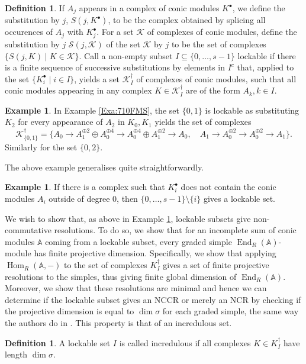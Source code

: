 \documentclass[reqno, 12pt]{amsart}
\theoremstyle{definition}
\newtheorem{definition}[theorem]{Definition}
\newtheorem{example}[theorem]{Example}
\numberwithin{equation}{section}
\newcommand{\newterm}{\textsf}
\newcommand{\Hom}{\operatorname{Hom}}
\newcommand{\End}{\operatorname{End}}
\begin{document}
\begin{definition}
    \label{Def:Substitution}
    If $A_j$ appears in a complex of conic modules $K^\bullet$, we define the \newterm{substitution by $j$}, $S(j,K^\bullet)$, to be the complex obtained by splicing all occurences of $A_j$ with $K_j^\bullet$. For a set $\mathcal{K}$ of complexes of conic modules, define the \newterm{substitution by $j$} $\mathcal{S}(j,\mathcal{K})$ of the set $\mathcal{K}$ by $j$ to be the set of complexes $\{S(j,K)\mid K\in \mathcal{K}\}$. Call a non-empty subset $I\subseteq \{0,\dots,s-1\}$ \newterm{lockable} if there is a finite sequence of successive substitutions by elements in $I^c$ that, applied to the set $\{K_i^\bullet\mid i\in I\}$, yields a set $\mathcal{K}^\dagger_I$ of complexes of conic modules, such that all conic modules appearing in any complex $K\in \mathcal{K}^\dagger_I$ are of the form $A_k, k\in I$.
\end{definition}

\begin{example}
    \label{Exa:FMSviaLockable}
    In Example \ref{Exa:710FMS}, the set $\{0,1\}$ is lockable as substituting $K_2$ for every appearance of $A_2$ in $K_0, K_1$ yields the set of complexes \[\mathcal{K}_{\{0,1\}}^\dagger=\{
    A_0\rightarrow A_1^{\oplus 2}\oplus A_0^{\oplus 4}\rightarrow A_0^{\oplus 4}\oplus A_1^{\oplus 2}\rightarrow A_0,\quad A_1\rightarrow A_0^{\oplus 2}\rightarrow A_0^{\oplus 2}\rightarrow A_1
    \}.\]
    Similarly for the set $\{0,2\}$.
\end{example}
\noindent The above example generalises quite straightforwardly.
\begin{example}
    If there is a complex such that $K_i^\bullet$ does not contain the conic modules $A_i$ outside of degree $0$, then $\{0,\dots,s-1\}\setminus \{i\}$ gives a lockable set.
\end{example}


We wish to show that, as above in Example \ref{Exa:FMSviaLockable}, lockable subsets give non-commutative resolutions. To do so, we show that for an incomplete sum of conic modules $\mathbb{A}$ coming from a lockable subset, every graded simple $\End_R(\mathbb{A})$-module has finite projective dimension. Specifically, we show that applying $\Hom_R(\mathbb{A},-)$ to the set of complexes $K_I^\dagger$ gives a set of finite projective resolutions to the simples, thus giving finite global dimension of $\End_R(\mathbb{A})$. Moreover, we show that these resolutions are minimal and hence we can determine if the lockable subset gives an NCCR or merely an NCR by checking if the projective dimension is equal to $\dim \sigma$ for each graded simple, the same way the authors do in \cite{FMS19}. This property is that of an \newterm{incredulous} set.
\begin{definition}
    \label{Def:Incredulous}
    A lockable set $I$ is called \newterm{incredulous} if all complexes $K\in K_I^\dagger$ have length $\dim \sigma$.
\end{definition}
\end{document}
